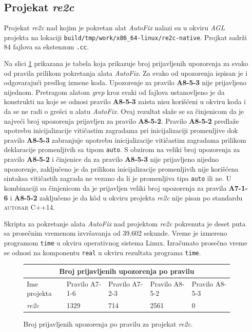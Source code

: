 \documentclass[12pt,oneside]{memoir}
\begin{document}
\subsection{Projekat \textit{re2c}}

Projekat \textit{re2c} nad kojim je pokretan alat \textit{AutoFix} nalazi su u okviru \textit{AGL} projekta na lokaciji \texttt{build/tmp/work/x86\_64-linux/re2c-native}. Projkat sadr\v{z}i 84 fajlova sa ekstenzom \texttt{.cc}. \par
Na slici \ref{fig:re2c} prikazana je tabela koja prikazuje broj prijavljenih upozorenja za svako od pravila prilikom pokretanja alata \textit{AutoFix}.
Za svako od upozorenja ispisan je i odgovaraju\'{c}i predlog izmene koda. Upozorenje za pravilo \textbf{A8-5-3} nije prijavljeno nijednom. Pretragom
alatom \textit{grep} kroz svaki od fajlova ustanovljeno je da konstrukti na koje se odnosi pravilo \textbf{A8-5-3} zaista nisu kori\v{s}\'{c}eni u okviru koda i da se ne radi o gre\v{s}ci u alatu \textit{AutoFix}. Ovaj rezultat sla\v{z}e se sa \v{c}injenicom da je najve\'{c}i broj upozorenja prijavljen za pravilo \textbf{A8-5-2}. Pravilo \textbf{A8-5-2} predla\v{z}e upotrebu inicijalizacije viti\v{c}astim zagradama pri inicijalizaciji promenljive dok pravilo \textbf{A8-5-3} zabranjuje upotrebu inicijalizacije viti\v{c}astim zagradama prilikom deklaracije promenljivih sa tipom \texttt{auto}. S obzirom na veliki broj upozorenja za pravilo \textbf{A8-5-2} i \v{c}injenice da za pravilo \textbf{A8-5-3} nije prijavljeno nijedno upozorenje, zaklju\v{c}eno je da prilikom inicijalizacije promenljivih nije kori\v{s}\'{c}ena sintaksa viti\v{c}astih zagrada ne vezano da li je promenljiva
tipa \texttt{auto} ili ne. U kombinaciji sa \v{c}injenicom da je prijavljen veliki broj upozorenja za pravila \textbf{A7-1-6} i \textbf{A8-5-2} zaklju\v{c}eno je da k\^{o}d u okviru projekta \textit{re2c} nije pisan po standardu \textsc{autosar} C++14. \par
Skripta za pokretanje alata \textit{AutoFix} nad projektom \textit{re2c} pokrenuta je deset puta sa prose\v{c}nim vremenom izvr\v{s}avanja od 39.602 sekunde. Vreme je izmereno programom \texttt{time} u okviru operativnog sistema Linux. Izra\v{c}unato prose\v{c}no vreme se odnosi na komponentu \texttt{real} u okviru rezultata programa \texttt{time}.
\begin{figure}
\begin{center}
\begin{tabular}{ |p{3cm}||p{2cm}|p{2cm}|p{2cm}|p{2cm}|  }
 \hline
 \multicolumn{5}{|c|}{Broj prijavljenih upozorenja po pravilu} \\
 \hline
 Ime projekta & Pravilo A7-1-6 & Pravilo A7-2-3 & Pravilo A8-5-2 & Pravilo A8-5-3\\
 \hline
 \textit{re2c}   & 1329            & 714             & 2561            & 0\\
 \hline
\end{tabular}
\caption{Broj prijavljenih upozorenja po pravilu za projekat \textit{re2c}.}
\label{fig:re2c}
\end{center}
\end{figure}
\end{document}
